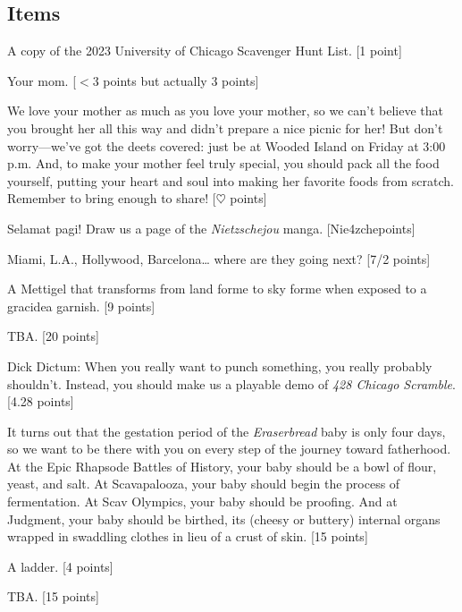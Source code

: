 \documentclass{book}
\begin{document}
\begin{list}{}{}


\newpage
\section*{Items}
\item A copy of the 2023 University of Chicago Scavenger Hunt List. [1 point]
\item Your mom. [$<$3 points but actually 3 points]
\item We love your mother as much as you love your mother, so we can’t believe that you brought her all this way and didn’t prepare a nice picnic for her! But don’t worry---we’ve got the deets covered: just be at Wooded Island on Friday at 3:00 p.m. And, to make your mother feel truly special, you should pack all the food yourself, putting your heart and soul into making her favorite foods from scratch. Remember to bring enough to share! [$\heartsuit$ points]
\item Selamat pagi! Draw us a page of the \textit{Nietzschejou} manga. [Nie4zchepoints]
\item Miami, L.A., Hollywood, Barcelona… where are they going next? [7/2 points]
\item A Mettigel that transforms from land forme to sky forme when exposed to a gracidea garnish. [9 points]
\item TBA. [20 points] %
\item Dick Dictum: When you really want to punch something, you really probably shouldn't. Instead, you should make us a playable demo of \textit{428 Chicago Scramble}. [4.28 points] \textleaf
\item It turns out that the gestation period of the \textit{Eraserbread} baby is only four days, so we want to be there with you on every step of the journey toward fatherhood. At the Epic Rhapsode Battles of History, your baby should be a bowl of flour, yeast, and salt. At Scavapalooza, your baby should begin the process of fermentation. At Scav Olympics, your baby should be proofing. And at Judgment, your baby should be birthed, its (cheesy or buttery) internal organs wrapped in swaddling clothes in lieu of a crust of skin. [15 points]
\item A ladder. [4 points]
\item TBA. [15 points]%

\end{list}
\end{document}
